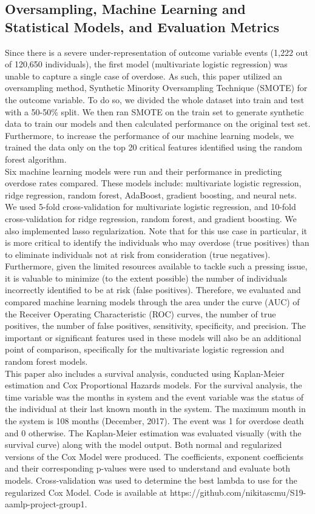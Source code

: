 \documentclass[twoside,10.5pt]{article}
\begin{document}
\subsection{Oversampling, Machine Learning and Statistical Models, and Evaluation Metrics}
Since there is a severe under-representation of outcome variable events (1,222 out of 120,650 individuals), the first model (multivariate logistic regression) was unable to capture a single case of overdose. As such, this paper utilized an oversampling method, Synthetic Minority Oversampling Technique (SMOTE) for the outcome variable. To do so, we divided the whole dataset into train and test with a 50-50\% split. We then ran SMOTE on the train set to generate synthetic data to train our models and then calculated performance on the original test set. Furthermore, to increase the performance of our machine learning models, we trained the data only on the top 20 critical features identified using the random forest algorithm.\\

Six machine learning models were run and their performance in predicting overdose rates compared. These models include: multivariate logistic regression, ridge regression, random forest, AdaBoost, gradient boosting, and neural nets. We used 5-fold cross-validation for multivariate logistic regression, and 10-fold cross-validation for ridge regression, random forest, and gradient boosting. We also implemented lasso regularization. Note that for this use case in particular, it is more critical to identify the individuals who may overdose (true positives) than to eliminate individuals not at risk from consideration (true negatives). Furthermore, given the limited resources available to tackle such a pressing issue, it is valuable to minimize (to the extent possible) the number of individuals incorrectly identified to be at risk (false positives). Therefore, we evaluated and compared machine learning models through the area under the curve (AUC) of the Receiver Operating Characteristic (ROC) curves, the number of true positives, the number of false positives, sensitivity, specificity, and precision. The important or significant features used in these models will also be an additional point of comparison, specifically for the multivariate logistic regression and random forest models.\\

This paper also includes a survival analysis, conducted using Kaplan-Meier estimation and Cox Proportional Hazards models. For the survival analysis, the time variable was the months in system and the event variable was the status of the individual at their last known month in the system. The maximum month in the system is 108 months (December, 2017). The event was 1 for overdose death and 0 otherwise. The Kaplan-Meier estimation was evaluated visually (with the survival curve) along with the model output. Both normal and regularized versions of the Cox Model were produced. The coefficients, exponent coefficients and their corresponding p-values were used to understand and evaluate both models. Cross-validation was used to determine the best lambda to use for the regularized Cox Model. 
Code is available at https://github.com/nikitascmu/S19-aamlp-project-group1. 
\end{document}
